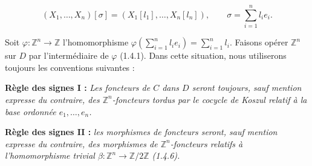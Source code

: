\begin{equation}
  (X_1,\ldots,X_n)[\sigma]
  =(X_1[l_1],\ldots,X_n[l_n]),
  \qquad
  \sigma=\sum_{i=1}^{n}l_i e_i.
  \tag{1.6.6.1}
\end{equation}

Soit $\varphi\colon\mathbb Z^n\longrightarrow\mathbb Z$
l'homomorphisme
$\varphi(\sum_{i=1}^{n}l_i e_i)=\sum_{i=1}^{n}l_i$.
Faisons opérer $\mathbb Z^n$ sur $D$ par l'intermédiaire de $\varphi$
(1.4.1). Dans cette situation, nous utiliserons toujours les
conventions suivantes :

\noindent\textbf{Règle des signes I :}
\emph{Les foncteurs de $C$ dans $D$ seront toujours, sauf mention
expresse du contraire, des $\mathbb Z^n$-foncteurs tordus par le
cocycle de Koszul relatif à la base ordonnée $e_1,\ldots,e_n$.}

\noindent\textbf{Règle des signes II :}
\emph{les morphismes de foncteurs seront, sauf mention expresse du
contraire, des morphismes de $\mathbb Z^n$-foncteurs relatifs à
l'homomorphisme trivial
$\beta\colon\mathbb Z^n\longrightarrow\mathbb Z/2\mathbb Z$ (1.4.6).}
